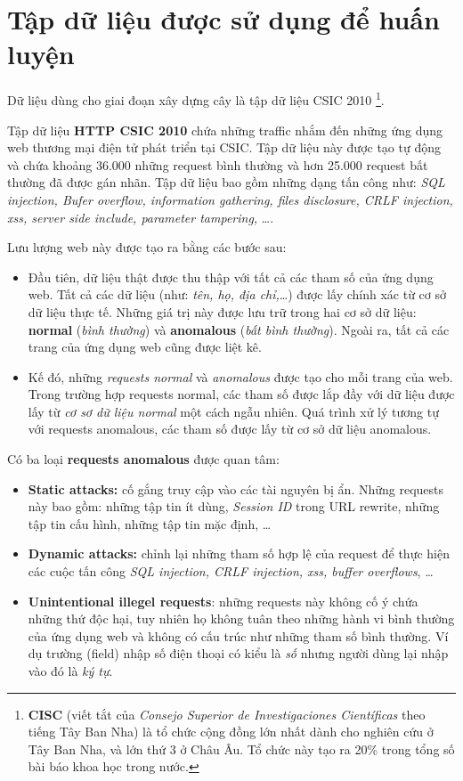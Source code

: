 \documentclass[../main-report.tex]{subfiles}
\begin{document}
\section{Tập dữ liệu được sử dụng để huấn luyện}
Dữ liệu dùng cho giai đoạn xây dựng cây là tập dữ liệu CSIC 2010 \footnote{\textbf{CISC} (viết tắt của \emph{Consejo Superior de Investigaciones Científicas} theo tiếng Tây Ban Nha) là tổ chức cộng đồng lớn nhất dành cho nghiên cứu ở Tây Ban Nha, và lớn thứ 3 ở Châu Âu. Tổ chức này tạo ra 20\% trong tổng số bài báo khoa học trong nước.}.

Tập dữ liệu \textbf{HTTP CSIC 2010} chứa những traffic nhắm đến những ứng dụng web thương mại điện tử phát triển tại CSIC. Tập dữ liệu này được tạo tự động và chứa khoảng 36.000 những request bình thường và hơn 25.000 request bất thường đã được gán nhãn. Tập dữ liệu bao gồm những dạng tấn công như: \emph{SQL injection, Bufer overflow, information gathering, files disclosure, CRLF injection, \acrshort{xss}, server side include, parameter tampering,} \ldots.

Lưu lượng web này được tạo ra bằng các bước sau:

\begin{itemize}
\item Đầu tiên, dữ liệu thật được thu thập với tất cả các tham số của ứng dụng web. Tất cả các dữ liệu (như: \emph{tên, họ, địa chỉ,}\ldots) được lấy chính xác từ cơ sở dữ liệu thực tế. Những giá trị này được lưu trữ trong hai cơ sở dữ liệu: \textbf{normal} (\emph{bình thường}) và \textbf{anomalous} (\emph{bất bình thường}). Ngoài ra, tất cả các trang của ứng dụng web cũng được liệt kê.

\item Kế đó, những \emph{requests normal} và \emph{anomalous} được tạo cho mỗi trang của web. Trong trường hợp requests normal, các tham số được lắp đầy với dữ liệu được lấy từ \emph{cơ sơ dữ liệu normal} một cách ngẫu nhiên. Quá trình xử lý tương tự với requests anomalous, các tham số được lấy từ cơ sở dữ liệu anomalous.
\end{itemize}

Có ba loại \textbf{requests anomalous} được quan tâm:

\begin{itemize}
\item \textbf{Static attacks:} cố gắng truy cập vào các tài nguyên bị ẩn. Những requests này bao gồm: những tập tin ít dùng, \emph{Session ID} trong URL rewrite, những tập tin cấu hình, những tập tin mặc định, \ldots
\item \textbf{Dynamic attacks:} chỉnh lại những tham số hợp lệ của request để thực hiện các cuộc tấn công \emph{SQL injection, CRLF injection, \acrshort{xss}, buffer overflows}, \ldots
\item \textbf{Unintentional illegel requests}: những requests này không cố ý chứa những thứ độc hại, tuy nhiên họ không tuân theo những hành vi bình thường của ứng dụng web và không có cấu trúc như những tham số bình thường. Ví dụ trường (field) nhập số điện thoại có kiểu là \emph{số} nhưng người dùng lại nhập vào đó là \emph{ký tự}.
\end{itemize}
\end{document}
